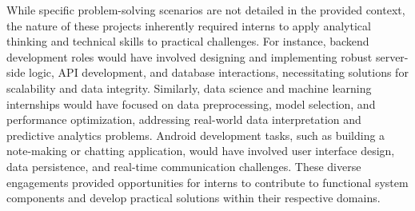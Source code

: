 \documentclass[11pt,a4paper]{article}
\newenvironment{card}{
    \begin{tcolorbox}[
        enhanced,
        colback=cardback,
        colframe=border,
        sharp corners,
        boxrule=0.5pt,
        drop shadow,
        drop shadow={shadow xshift=1mm,shadow yshift=-1mm,fill=border!50},
        boxsep=3mm,
        left=5mm, right=5mm, top=5mm, bottom=5mm,
        width=\textwidth,
        nobeforeafter
    ]
}{\end{tcolorbox}}
\begin{document}
\begin{card}
    While specific problem-solving scenarios are not detailed in the provided context, the nature of these projects inherently required interns to apply analytical thinking and technical skills to practical challenges. For instance, backend development roles would have involved designing and implementing robust server-side logic, API development, and database interactions, necessitating solutions for scalability and data integrity. Similarly, data science and machine learning internships would have focused on data preprocessing, model selection, and performance optimization, addressing real-world data interpretation and predictive analytics problems. Android development tasks, such as building a note-making or chatting application, would have involved user interface design, data persistence, and real-time communication challenges. These diverse engagements provided opportunities for interns to contribute to functional system components and develop practical solutions within their respective domains.
\end{card}

\vspace{0.5cm}
\end{document}
